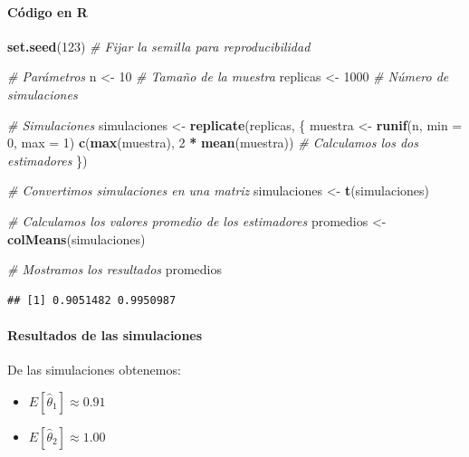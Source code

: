 \documentclass[
]{article}
\newenvironment{Shaded}{\begin{snugshade}}{\end{snugshade}}
\newcommand{\AttributeTok}[1]{\textcolor[rgb]{0.13,0.29,0.53}{#1}}
\newcommand{\CommentTok}[1]{\textcolor[rgb]{0.56,0.35,0.01}{\textit{#1}}}
\newcommand{\DecValTok}[1]{\textcolor[rgb]{0.00,0.00,0.81}{#1}}
\newcommand{\FunctionTok}[1]{\textcolor[rgb]{0.13,0.29,0.53}{\textbf{#1}}}
\newcommand{\NormalTok}[1]{#1}
\newcommand{\OtherTok}[1]{\textcolor[rgb]{0.56,0.35,0.01}{#1}}
\newcommand{\SpecialCharTok}[1]{\textcolor[rgb]{0.81,0.36,0.00}{\textbf{#1}}}
\providecommand{\tightlist}{%
  \setlength{\itemsep}{0pt}\setlength{\parskip}{0pt}}
\begin{document}
\paragraph{Código en R}\label{cuxf3digo-en-r}

\begin{Shaded}
\begin{Highlighting}[]
\FunctionTok{set.seed}\NormalTok{(}\DecValTok{123}\NormalTok{)  }\CommentTok{\# Fijar la semilla para reproducibilidad}

\CommentTok{\# Parámetros}
\NormalTok{n }\OtherTok{\textless{}{-}} \DecValTok{10}  \CommentTok{\# Tamaño de la muestra}
\NormalTok{replicas }\OtherTok{\textless{}{-}} \DecValTok{1000}  \CommentTok{\# Número de simulaciones}

\CommentTok{\# Simulaciones}
\NormalTok{simulaciones }\OtherTok{\textless{}{-}} \FunctionTok{replicate}\NormalTok{(replicas, \{}
\NormalTok{  muestra }\OtherTok{\textless{}{-}} \FunctionTok{runif}\NormalTok{(n, }\AttributeTok{min =} \DecValTok{0}\NormalTok{, }\AttributeTok{max =} \DecValTok{1}\NormalTok{)}
  \FunctionTok{c}\NormalTok{(}\FunctionTok{max}\NormalTok{(muestra), }\DecValTok{2} \SpecialCharTok{*} \FunctionTok{mean}\NormalTok{(muestra))  }\CommentTok{\# Calculamos los dos estimadores}
\NormalTok{\})}

\CommentTok{\# Convertimos simulaciones en una matriz}
\NormalTok{simulaciones }\OtherTok{\textless{}{-}} \FunctionTok{t}\NormalTok{(simulaciones)}

\CommentTok{\# Calculamos los valores promedio de los estimadores}
\NormalTok{promedios }\OtherTok{\textless{}{-}} \FunctionTok{colMeans}\NormalTok{(simulaciones)}

\CommentTok{\# Mostramos los resultados}
\NormalTok{promedios}
\end{Highlighting}
\end{Shaded}

\begin{verbatim}
## [1] 0.9051482 0.9950987
\end{verbatim}

\paragraph{Resultados de las simulaciones}\label{resultados-de-las-simulaciones}

De las simulaciones obtenemos:

\begin{itemize}
\tightlist
\item
  \(E[\hat{\theta}_1] \approx 0.91\)
\item
  \(E[\hat{\theta}_2] \approx 1.00\)
\end{itemize}
\end{document}
